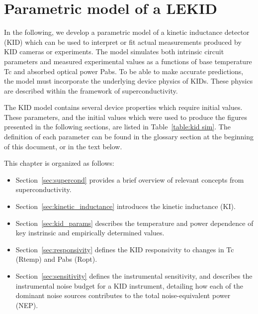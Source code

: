 \chapter{Parametric model of a LEKID}\label{kid_model}

In the following, we develop a parametric model of a kinetic inductance detector (KID) which can be used to interpret or fit actual measurements produced by KID cameras or experiments. The model simulates both intrinsic circuit parameters and measured experimental values as a functions of base temperature \gls{Tc} and absorbed optical power \gls{Pabs}. To be able to make accurate predictions, the model must incorporate the underlying device physics of KIDs. These physics are described within the framework of superconductivity.

The KID model contains several device properties which require initial values. These parameters, and the initial values which were used to produce the figures presented in the following sections, are listed in Table~\ref{table:kid sim}. The definition of each parameter can be found in the glossary section at the beginning of this document, or in the text below.

This chapter is organized as follows:

\begin{itemize}[nosep]
  \item Section~\ref{sec:supercond} provides a brief overview of relevant concepts from superconductivity.
  \item Section~\ref{sec:kinetic_inductance} introduces the kinetic inductance (KI).
  \item Section~\ref{sec:kid_params} describes the temperature and power dependence of key instrinsic and empirically determined values.
  \item Section~\ref{sec:responsivity} defines the KID responsivity to changes in \gls{Tc} (\gls{Rtemp}) and \gls{Pabs} (\gls{Ropt}).
  \item Section~\ref{sec:sensitivity} defines the instrumental sensitivity, and describes the instrumental noise budget for a KID instrument, detailing how each of the dominant noise sources contributes to the total noise-equivalent power (NEP).
\end{itemize}

